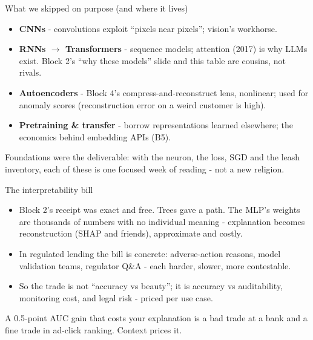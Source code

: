 \documentclass[10pt,aspectratio=169]{beamer}
\begin{document}
\begin{frame}{What we skipped on purpose (and where it lives)}
  \begin{itemize}
    \item \textbf{CNNs} - convolutions exploit ``pixels near pixels'';
          vision's workhorse.
    \item \textbf{RNNs $\to$ Transformers} - sequence models; attention
          (2017) is why LLMs exist. Block 2's ``why these models'' slide
          and this table are cousins, not rivals.
    \item \textbf{Autoencoders} - Block 4's compress-and-reconstruct
          lens, nonlinear; used for anomaly scores (reconstruction error
          on a weird customer is high).
    \item \textbf{Pretraining \& transfer} - borrow representations
          learned elsewhere; the economics behind embedding APIs (B5).
  \end{itemize}
  \vspace{0.4em}
  \begin{center}\small
    Foundations were the deliverable: with the neuron, the loss, SGD and
    the leash inventory, each of these is one focused week of reading -
    not a new religion.
  \end{center}
\end{frame}

\begin{frame}{The interpretability bill}
  \begin{itemize}
    \item Block 2's receipt was \alert{exact and free}. Trees gave a path.
          The MLP's weights are thousands of numbers with \alert{no
          individual meaning} - explanation becomes reconstruction
          (SHAP and friends), approximate and costly.
    \item In regulated lending the bill is concrete: adverse-action
          reasons, model validation teams, regulator Q\&A - each harder,
          slower, more contestable.
    \item So the trade is not ``accuracy vs beauty''; it is accuracy vs
          \alert{auditability, monitoring cost, and legal risk} - priced
          per use case.
  \end{itemize}
  \vspace{0.5em}
  \begin{center}
    A 0.5-point AUC gain that costs your explanation is a bad trade at a
    bank and a fine trade in ad-click ranking. \alert{Context prices it.}
  \end{center}
\end{frame}
\end{document}
